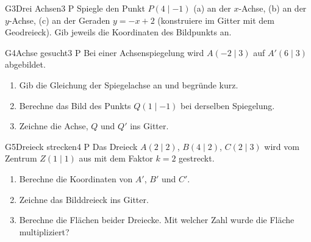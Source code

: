 \documentclass[11pt]{article}
\begin{document}

\begin{lpaufgabe}{G3}{Drei Achsen}{3 P}
Spiegle den Punkt $P(4 \mid -1)$ (a) an der $x$-Achse, (b) an der $y$-Achse, (c) an der Geraden $y = -x + 2$ (konstruiere im Gitter
mit dem Geodreieck). Gib jeweils die Koordinaten des Bildpunkts an.
\begin{center}
\end{center}
\end{lpaufgabe}

\begin{lpaufgabe}{G4}{Achse gesucht}{3 P}
Bei einer Achsenspiegelung wird $A(-2 \mid 3)$ auf $A'(6 \mid 3)$ abgebildet.
\begin{enumerate}[label=(\alph*),leftmargin=*,itemsep=3pt]
\item Gib die Gleichung der Spiegelachse an und begründe kurz.
\item Berechne das Bild des Punkts $Q(1 \mid -1)$ bei derselben Spiegelung.
\item Zeichne die Achse, $Q$ und $Q'$ ins Gitter.
\end{enumerate}
\begin{center}
\end{center}
\end{lpaufgabe}


\begin{lpaufgabe}{G5}{Dreieck strecken}{4 P}
Das Dreieck $A(2 \mid 2)$, $B(4 \mid 2)$, $C(2 \mid 3)$ wird vom Zentrum $Z(1 \mid 1)$ aus mit dem Faktor $k = 2$ gestreckt.
\begin{enumerate}[label=(\alph*),leftmargin=*,itemsep=3pt]
\item Berechne die Koordinaten von $A'$, $B'$ und $C'$.
\item Zeichne das Bilddreieck ins Gitter.
\item Berechne die Flächen beider Dreiecke. Mit welcher Zahl wurde die Fläche multipliziert?
\end{enumerate}
\begin{center}
\end{center}
\end{lpaufgabe}
\end{document}

